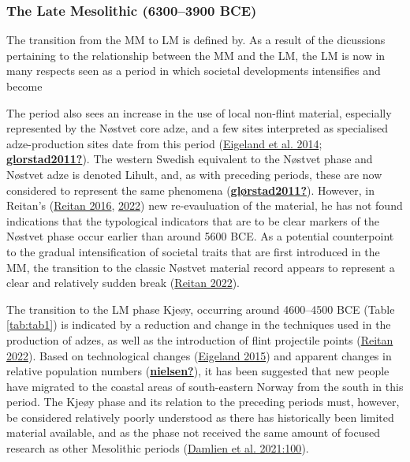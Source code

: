 \documentclass[
  a4paper,
  oneside]{uiophdthesis}
\begin{document}
\hypertarget{the-late-mesolithic-63003900-bce}{%
\subsubsection{The Late Mesolithic (6300--3900 BCE)}\label{the-late-mesolithic-63003900-bce}}

The transition from the MM to LM is defined by. As a result of the dicussions pertaining to the relationship between the MM and the LM, the LM is now in many respects seen as a period in which societal developments intensifies and become

The period also sees an increase in the use of local non-flint material, especially represented by the Nøstvet core adze, and a few sites interpreted as specialised adze-production sites date from this period (\protect\hyperlink{ref-eigeland2014}{Eigeland et al. 2014}; \protect\hyperlink{ref-glorstad2011}{\textbf{glorstad2011?}}). The western Swedish equivalent to the Nøstvet phase and Nøstvet adze is denoted Lihult, and, as with preceding periods, these are now considered to represent the same phenomena (\protect\hyperlink{ref-gluxf8rstad2011}{\textbf{glørstad2011?}}). However, in Reitan's (\protect\hyperlink{ref-reitan2016}{Reitan 2016}, \protect\hyperlink{ref-reitan2022}{2022}) new re-evauluation of the material, he has not found indications that the typological indicators that are to be clear markers of the Nøstvet phase occur earlier than around 5600 BCE. As a potential counterpoint to the gradual intensification of societal traits that are first introduced in the MM, the transition to the classic Nøstvet material record appears to represent a clear and relatively sudden break (\protect\hyperlink{ref-reitan2022}{Reitan 2022}).

The transition to the LM phase Kjeøy, occurring around 4600--4500 BCE (Table \ref{tab:tab1}) is indicated by a reduction and change in the techniques used in the production of adzes, as well as the introduction of flint projectile points (\protect\hyperlink{ref-reitan2022}{Reitan 2022}). Based on technological changes (\protect\hyperlink{ref-eigeland2015}{Eigeland 2015}) and apparent changes in relative population numbers (\protect\hyperlink{ref-nielsen}{\textbf{nielsen?}}), it has been suggested that new people have migrated to the coastal areas of south-eastern Norway from the south in this period. The Kjeøy phase and its relation to the preceding periods must, however, be considered relatively poorly understood as there has historically been limited material available, and as the phase not received the same amount of focused research as other Mesolithic periods (\protect\hyperlink{ref-damlien2021}{Damlien et al. 2021:100}).
\end{document}
